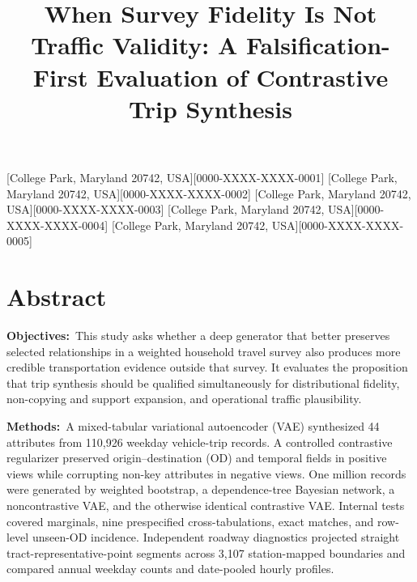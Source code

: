 \documentclass[numbered]{trbunofficial}
\begin{document}
\title{When Survey Fidelity Is Not Traffic Validity: A Falsification-First Evaluation of Contrastive Trip Synthesis}

[College Park, Maryland 20742, USA][0000-XXXX-XXXX-0001]
[College Park, Maryland 20742, USA][0000-XXXX-XXXX-0002]
[College Park, Maryland 20742, USA][0000-XXXX-XXXX-0003]
[College Park, Maryland 20742, USA][0000-XXXX-XXXX-0004]
[College Park, Maryland 20742, USA][0000-XXXX-XXXX-0005]



\maketitle

\section{Abstract}
\noindent\textbf{Objectives:}~This study asks whether a deep generator that better preserves selected relationships in a weighted household travel survey also produces more credible transportation evidence outside that survey. It evaluates the proposition that trip synthesis should be qualified simultaneously for distributional fidelity, non-copying and support expansion, and operational traffic plausibility.

\hfill\break%
\noindent\textbf{Methods:}~A mixed-tabular variational autoencoder (VAE) synthesized 44 attributes from 110,926 weekday vehicle-trip records. A controlled contrastive regularizer preserved origin--destination (OD) and temporal fields in positive views while corrupting non-key attributes in negative views. One million records were generated by weighted bootstrap, a dependence-tree Bayesian network, a noncontrastive VAE, and the otherwise identical contrastive VAE. Internal tests covered marginals, nine prespecified cross-tabulations, exact matches, and row-level unseen-OD incidence. Independent roadway diagnostics projected straight tract-representative-point segments across 3,107 station-mapped boundaries and compared annual weekday counts and date-pooled hourly profiles.
\end{document}
